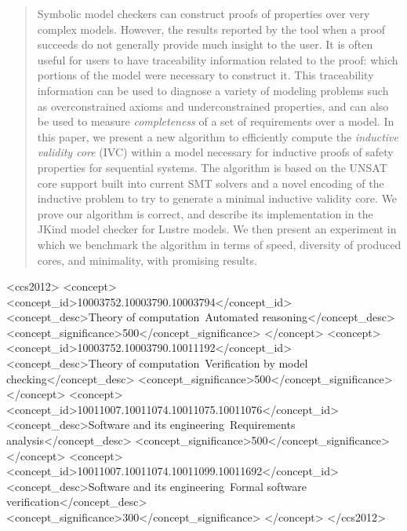 \documentclass{sig-alternate-05-2015}
\begin{document}
\begin{abstract}
Symbolic model checkers can construct proofs of properties over very complex models.  However, the results reported by the tool when a proof succeeds do not generally provide much insight to the user.  It is often useful for users to have traceability information related to the proof: which portions of the model were necessary to construct it.  This traceability information can be used to diagnose a variety of modeling problems such as overconstrained axioms and underconstrained properties, and can also be used to measure {\em completeness} of a set of requirements over a model.  In this paper, we present a new algorithm to efficiently compute the {\em inductive validity core} (IVC) within a model necessary for inductive proofs of safety properties for sequential systems.  The algorithm is based on the UNSAT core support built into current SMT solvers and a novel encoding of the inductive problem to try to generate a minimal inductive validity core.  We prove our algorithm is correct, and describe its implementation in the JKind model checker for Lustre models.  We then present an experiment in which we benchmark the algorithm in terms of speed, diversity of produced cores, and minimality, with promising results.
\end{abstract}

\begin{CCSXML}
<ccs2012>
<concept>
<concept_id>10003752.10003790.10003794</concept_id>
<concept_desc>Theory of computation~Automated reasoning</concept_desc>
<concept_significance>500</concept_significance>
</concept>
<concept>
<concept_id>10003752.10003790.10011192</concept_id>
<concept_desc>Theory of computation~Verification by model checking</concept_desc>
<concept_significance>500</concept_significance>
</concept>
<concept>
<concept_id>10011007.10011074.10011075.10011076</concept_id>
<concept_desc>Software and its engineering~Requirements analysis</concept_desc>
<concept_significance>500</concept_significance>
</concept>
<concept>
<concept_id>10011007.10011074.10011099.10011692</concept_id>
<concept_desc>Software and its engineering~Formal software verification</concept_desc>
<concept_significance>300</concept_significance>
</concept>
</ccs2012>
\end{CCSXML}

\printccsdesc 
{}
\end{document}
